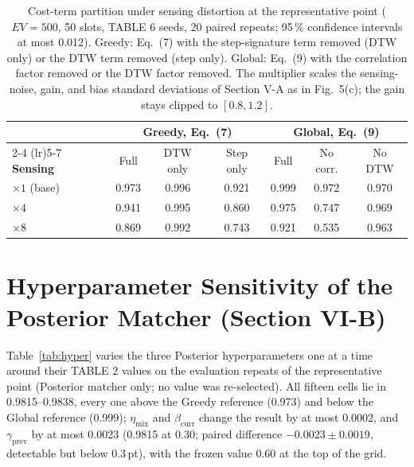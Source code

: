 \documentclass[10pt]{article}
\begin{document}
\begin{table}[h]
\centering
\caption{Cost-term partition under sensing distortion at the representative point ($EV = 500$, 50 slots, TABLE 6 seeds, 20 paired repeats; 95\,\% confidence intervals at most 0.012). Greedy: Eq.~(7) with the step-signature term removed (DTW only) or the DTW term removed (step only). Global: Eq.~(9) with the correlation factor removed or the DTW factor removed. The multiplier scales the sensing-noise, gain, and bias standard deviations of Section V-A as in Fig.~5(c); the gain stays clipped to $[0.8, 1.2]$.}
\label{tab:termpart}
\small
\begin{tabular}{@{}l ccc ccc@{}}
\toprule
& \multicolumn{3}{c}{\textbf{Greedy, Eq.~(7)}} & \multicolumn{3}{c}{\textbf{Global, Eq.~(9)}} \\
\cmidrule(lr){2-4} \cmidrule(lr){5-7}
\textbf{Sensing} & Full & DTW only & Step only & Full & No corr. & No DTW \\
\midrule
$\times 1$ (base) & 0.973 & 0.996 & 0.921 & 0.999 & 0.972 & 0.970 \\
$\times 4$ & 0.941 & 0.995 & 0.860 & 0.975 & 0.747 & 0.969 \\
$\times 8$ & 0.869 & 0.992 & 0.743 & 0.921 & 0.535 & 0.963 \\
\bottomrule
\end{tabular}
\end{table}

\section{Hyperparameter Sensitivity of the Posterior Matcher (Section VI-B)}

Table~\ref{tab:hyper} varies the three Posterior hyperparameters one at a time around their TABLE 2 values on the evaluation repeats of the representative point (Posterior matcher only; no value was re-selected). All fifteen cells lie in 0.9815--0.9838, every one above the Greedy reference (0.973) and below the Global reference (0.999); $\eta_{\text{mix}}$ and $\beta_{\text{curr}}$ change the result by at most 0.0002, and $\gamma_{\text{prev}}$ by at most 0.0023 (0.9815 at 0.30; paired difference $-0.0023 \pm 0.0019$, detectable but below 0.3\,pt), with the frozen value 0.60 at the top of the grid.
\end{document}
